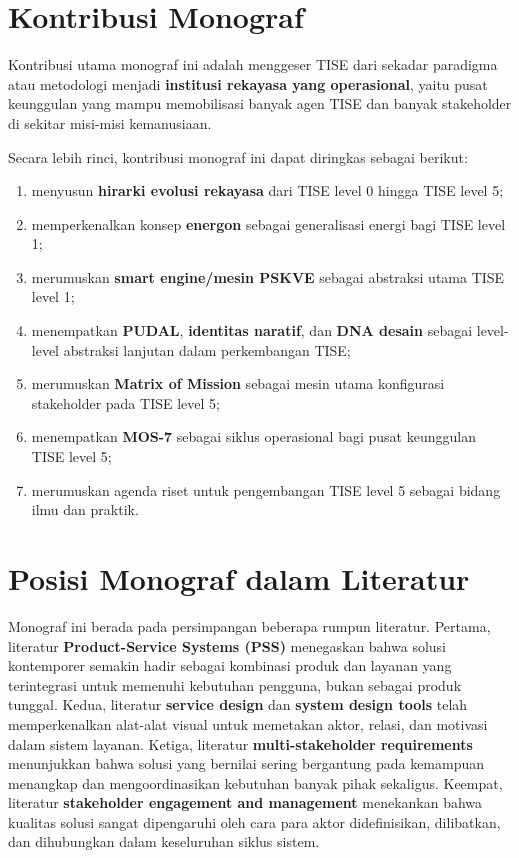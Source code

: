 \documentclass[
  letterpaper,
  DIV=11,
  numbers=noendperiod]{scrreprt}
\providecommand{\tightlist}{%
  \setlength{\itemsep}{0pt}\setlength{\parskip}{0pt}}
\begin{document}
\section*{Kontribusi Monograf}\label{kontribusi-monograf}


Kontribusi utama monograf ini adalah menggeser TISE dari sekadar
paradigma atau metodologi menjadi \textbf{institusi rekayasa yang
operasional}, yaitu pusat keunggulan yang mampu memobilisasi banyak agen
TISE dan banyak stakeholder di sekitar misi-misi kemanusiaan.

Secara lebih rinci, kontribusi monograf ini dapat diringkas sebagai
berikut:

\begin{enumerate}
\def\labelenumi{\arabic{enumi}.}
\tightlist
\item
  menyusun \textbf{hirarki evolusi rekayasa} dari TISE level 0 hingga
  TISE level 5;
\item
  memperkenalkan konsep \textbf{energon} sebagai generalisasi energi
  bagi TISE level 1;
\item
  merumuskan \textbf{smart engine/mesin PSKVE} sebagai abstraksi utama
  TISE level 1;
\item
  menempatkan \textbf{PUDAL}, \textbf{identitas naratif}, dan
  \textbf{DNA desain} sebagai level-level abstraksi lanjutan dalam
  perkembangan TISE;
\item
  merumuskan \textbf{Matrix of Mission} sebagai mesin utama konfigurasi
  stakeholder pada TISE level 5;
\item
  menempatkan \textbf{MOS-7} sebagai siklus operasional bagi pusat
  keunggulan TISE level 5;
\item
  merumuskan agenda riset untuk pengembangan TISE level 5 sebagai bidang
  ilmu dan praktik.
\end{enumerate}

\section*{Posisi Monograf dalam
Literatur}\label{posisi-monograf-dalam-literatur}


Monograf ini berada pada persimpangan beberapa rumpun literatur.
Pertama, literatur \textbf{Product-Service Systems (PSS)} menegaskan
bahwa solusi kontemporer semakin hadir sebagai kombinasi produk dan
layanan yang terintegrasi untuk memenuhi kebutuhan pengguna, bukan
sebagai produk tunggal. Kedua, literatur \textbf{service design} dan
\textbf{system design tools} telah memperkenalkan alat-alat visual untuk
memetakan aktor, relasi, dan motivasi dalam sistem layanan. Ketiga,
literatur \textbf{multi-stakeholder requirements} menunjukkan bahwa
solusi yang bernilai sering bergantung pada kemampuan menangkap dan
mengoordinasikan kebutuhan banyak pihak sekaligus. Keempat, literatur
\textbf{stakeholder engagement and management} menekankan bahwa kualitas
solusi sangat dipengaruhi oleh cara para aktor didefinisikan,
dilibatkan, dan dihubungkan dalam keseluruhan siklus sistem.
\end{document}
